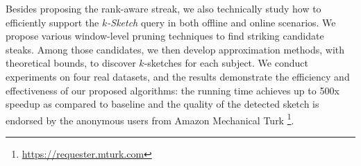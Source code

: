 

Besides proposing the rank-aware streak, we also technically 
study how to efficiently support the \emph{$k$-Sketch} query in both
offline and online scenarios. We propose various window-level 
pruning techniques to find striking candidate steaks.
Among those candidates, we then develop approximation
methods, with theoretical bounds, to discover $k$-sketches for each subject. 
We conduct experiments on four real
datasets, and the results demonstrate the efficiency and 
effectiveness of our proposed algorithms: the running time
achieves up to 500x speedup as compared to baseline and the quality of the
detected sketch is endorsed by the anonymous users
from Amazon Mechanical Turk \footnote{\url{https://requester.mturk.com}}.

